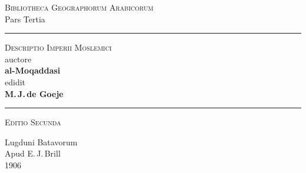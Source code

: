 \documentclass[11pt,a4paper]{article}
\newcommand{\shortline}{\noindent\rule{0.5\textwidth}{0.4pt}\par}
\begin{document}
\thispagestyle{empty}
\begin{center}
\vspace*{3cm}

{\Large\textsc{Bibliotheca Geographorum Arabicorum}}\\[0.5cm]
{\small Pars Tertia}\\[2cm]

\shortline
\vspace{1cm}

{\LARGE\scshape Descriptio Imperii Moslemici}\\[0.5cm]
\vspace{0.5cm}
{\Large auctore}\\[0.5cm]
{\LARGE\bfseries al-Moqaddasi}\\[0.3cm]
{\large edidit}\\[0.3cm]
{\Large\bfseries M.\,J.\,de Goeje}\\[1cm]

\shortline
\vspace{1cm}

{\large\textsc{Editio Secunda}}\\[1.5cm]

\vfill

{\large Lugduni Batavorum}\\
{\large Apud E.\,J.\,Brill}\\
{\large 1906}\\

\vspace{2cm}

\end{center}
\clearpage
\end{document}
